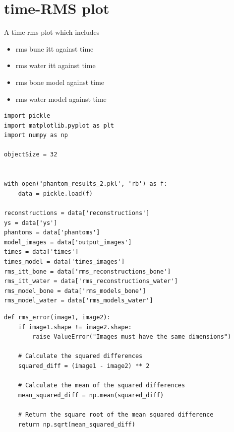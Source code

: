 \section{time-RMS plot}

A time-rms plot which includes

\begin{itemize}
\item rms bune itt against time
\item rms water itt against time
\item rms bone model against time
\item rms water model against time
\end{itemize}

\begin{verbatim}
import pickle 
import matplotlib.pyplot as plt
import numpy as np

objectSize = 32


with open('phantom_results_2.pkl', 'rb') as f:
    data = pickle.load(f)

reconstructions = data['reconstructions']
ys = data['ys']
phantoms = data['phantoms']
model_images = data['output_images']
times = data['times']
times_model = data['times_images']
rms_itt_bone = data['rms_reconstructions_bone']
rms_itt_water = data['rms_reconstructions_water']
rms_model_bone = data['rms_models_bone']
rms_model_water = data['rms_models_water']
\end{verbatim}

\begin{verbatim}
def rms_error(image1, image2):
    if image1.shape != image2.shape:
        raise ValueError("Images must have the same dimensions")

    # Calculate the squared differences
    squared_diff = (image1 - image2) ** 2

    # Calculate the mean of the squared differences
    mean_squared_diff = np.mean(squared_diff)

    # Return the square root of the mean squared difference
    return np.sqrt(mean_squared_diff)
\end{verbatim}

